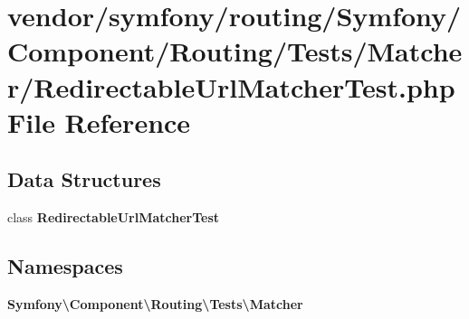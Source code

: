 \section{vendor/symfony/routing/\+Symfony/\+Component/\+Routing/\+Tests/\+Matcher/\+Redirectable\+Url\+Matcher\+Test.php File Reference}
\label{_redirectable_url_matcher_test_8php}
\subsection*{Data Structures}
\begin{DoxyCompactItemize}
\item 
class {\bf Redirectable\+Url\+Matcher\+Test}
\end{DoxyCompactItemize}
\subsection*{Namespaces}
\begin{DoxyCompactItemize}
\item 
 {\bf Symfony\textbackslash{}\+Component\textbackslash{}\+Routing\textbackslash{}\+Tests\textbackslash{}\+Matcher}
\end{DoxyCompactItemize}
